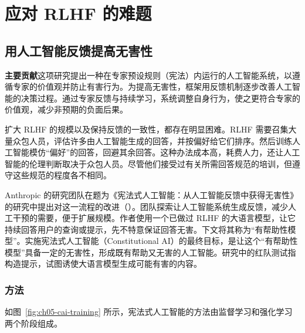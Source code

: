 \section{应对 RLHF 的难题}
\label{sec:ch05-rlhf-challenges}
\subsection{用人工智能反馈提高无害性}
\begin{keypoint}
\noindent\textbf{主要贡献}\quad 这项研究提出一种在专家预设规则（宪法）内运行的人工智能系统，以遵循专家的价值观并防止有害行为。为提高无害性，框架用反馈机制逐步改善人工智能的决策过程。通过专家反馈与持续学习，系统调整自身行为，使之更符合专家的价值观，减少非预期的负面后果。
\end{keypoint}

扩大 RLHF 的规模以及保持反馈的一致性，都存在明显困难。RLHF 需要召集大量众包人员，评估许多由人工智能生成的回答，并按偏好给它们排序。然后训练人工智能模仿“偏好”的回答，回避其余回答。这种办法成本高，耗费人力，还让人工智能的伦理判断取决于众包人员。尽管他们接受过有关所需回答规范的培训，但遵守这些规范的程度各不相同。

Anthropic 的研究团队在题为《宪法式人工智能：从人工智能反馈中获得无害性》的研究中提出对这一流程的改进（）。团队探索让人工智能系统生成反馈，减少人工干预的需要，便于扩展规模。作者使用一个已做过 RLHF 的大语言模型，让它持续回答用户的查询或提示，先不特意保证回答无害。下文将其称为“有帮助性模型”。实施宪法式人工智能（Constitutional AI）的最终目标，是让这个“有帮助性模型”具备一定的无害性，形成既有帮助又无害的人工智能。研究中的红队测试指构造提示，试图诱使大语言模型生成可能有害的内容。

\subsubsection{方法}
\label{sec:ch05-cai-method}
如图~\ref{fig:ch05-cai-training} 所示，宪法式人工智能的方法由监督学习和强化学习两个阶段组成。


